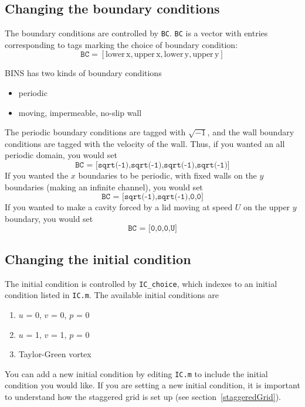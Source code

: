 \documentclass[12pt]{article}
\begin{document}
\subsection{Changing the boundary conditions}
The boundary conditions are controlled by \texttt{BC}.  \texttt{BC} is a vector with entries corresponding to tags marking the choice of boundary condition:
\[ \texttt{BC} = [\mathrm{lower \hspace{2pt} x, upper\hspace{2pt} x, lower\hspace{2pt} y, upper\hspace{2pt} y} ]\]

BINS has two kinds of boundary conditions
\begin{itemize}
\item periodic
\item moving, impermeable, no-slip wall
\end{itemize}

The periodic boundary conditions are tagged with $\sqrt{-1}$, and the wall boundary conditions are tagged with the velocity of the wall.  Thus, if you wanted an all periodic domain, you would set
\[ \texttt{BC = [sqrt(-1),sqrt(-1),sqrt(-1),sqrt(-1)]}\]
If you wanted the $x$ boundaries to be periodic, with fixed walls on the $y$ boundaries (making an infinite channel), you would set
\[ \texttt{BC = [sqrt(-1),sqrt(-1),0,0]}\]
If you wanted to make a cavity forced by a lid moving at speed $U$ on the upper $y$ boundary, you would set
\[ \texttt{BC = [0,0,0,U]}\]

\subsection{Changing the initial condition}
The initial condition is controlled by \texttt{IC\_choice}, which indexes to an initial condition listed in \texttt{IC.m}.  The available initial conditions are 
\begin{enumerate}
\item $u$ = 0, $v$ = 0, $p$ = 0
\item $u$ = 1, $v$ = 1, $p$ = 0
\item Taylor-Green vortex
\end{enumerate}
You can add a new initial condition by editing \texttt{IC.m} to include the initial condition you would like.  If you are setting a new initial condition, it is important to understand how the staggered grid is set up (see section~\ref{staggeredGrid}).

\end{document}
